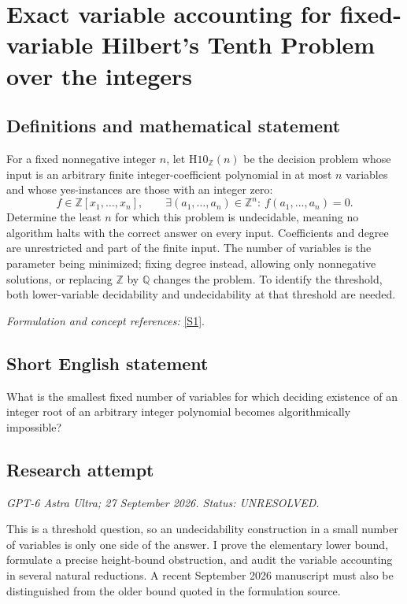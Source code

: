 \documentclass[11pt]{article}
\begin{document}
\section*{\texorpdfstring{Exact variable accounting for fixed-variable Hilbert's Tenth Problem over the integers}{Exact variable accounting for fixed-variable Hilbert's Tenth Problem over the integers}}\label{statement}
\subsection{Definitions and mathematical statement}
For a fixed nonnegative integer $n$, let $\mathrm{H10}_{{\mathbb{Z}}}(n)$ be the decision problem whose input is an arbitrary finite integer-coefficient polynomial in at most $n$ variables and whose yes-instances are those with an integer zero:
\[
 f\in{\mathbb{Z}}[x_1,\ldots,x_n],\qquad
 \exists (a_1,\ldots,a_n)\in{\mathbb{Z}}^n:\ f(a_1,\ldots,a_n)=0.
\]
Determine the least $n$ for which this problem is undecidable, meaning no algorithm halts with the correct answer on every input. Coefficients and degree are unrestricted and part of the finite input. The number of variables is the parameter being minimized; fixing degree instead, allowing only nonnegative solutions, or replacing ${\mathbb{Z}}$ by ${\mathbb{Q}}$ changes the problem. To identify the threshold, both lower-variable decidability and undecidability at that threshold are needed.
\par\smallskip\textit{Formulation and concept references:} \href{https://www.cs.umd.edu/users/gasarch/open/hilbert10openproblems.pdf}{[S1]}.

\subsection{Short English statement}
What is the smallest fixed number of variables for which deciding existence of an integer root of an arbitrary integer polynomial becomes algorithmically impossible?
\subsection{Research attempt}
\textit{GPT-6 Astra Ultra; 27 September 2026. Status: UNRESOLVED.}

This is a threshold question, so an undecidability construction in a
small number of variables is only one side of the answer. I prove the
elementary lower bound, formulate a precise height-bound obstruction,
and audit the variable accounting in several natural reductions. A
recent September 2026 manuscript must also be distinguished from the
older bound quoted in the formulation source.
\end{document}
